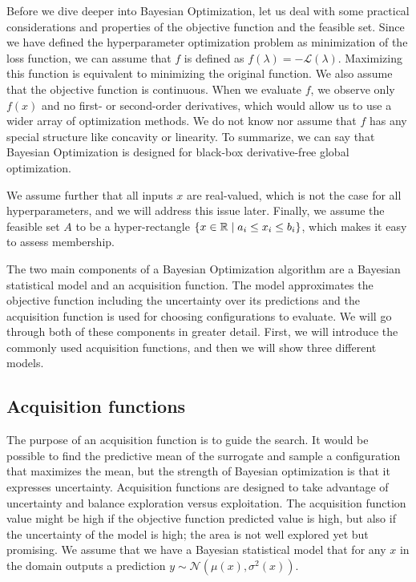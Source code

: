 Before we dive deeper into Bayesian Optimization, let us deal with some practical considerations and properties of the objective function and the feasible set. Since we have defined the hyperparameter optimization problem as minimization of the loss function, we can assume that $f$ is defined as $f(\lambda)=-\mathcal{L}(\lambda)$. Maximizing this function is equivalent to minimizing the original function. We also assume that the objective function is continuous. When we evaluate $f$, we observe only $f(x)$ and no first- or second-order derivatives, which would allow us to use a wider array of optimization methods. We do not know nor assume that $f$ has any special structure like concavity or linearity. To summarize, we can say that Bayesian Optimization is designed for black-box derivative-free global optimization.


We assume further that all inputs $x$ are real-valued, which is not the case for all hyperparameters, and we will address this issue later. Finally, we assume the feasible set $A$ to be a hyper-rectangle $\{ x \in \mathbb{R} \mid a_i \leq x_i \leq b_i \}$, which makes it easy to assess membership.


The two main components of a Bayesian Optimization algorithm are a Bayesian statistical model and an acquisition function. The model approximates the objective function including the uncertainty over its predictions and the acquisition function is used for choosing configurations to evaluate. We will go through both of these components in greater detail. First, we will introduce the commonly used acquisition functions, and then we will show three different models.

\subsection{Acquisition functions}
The purpose of an acquisition function is to guide the search. It would be possible to find the predictive mean of the surrogate and sample a configuration that maximizes the mean, but the strength of Bayesian optimization is that it expresses uncertainty. Acquisition functions are designed to take advantage of uncertainty and balance exploration versus exploitation. The acquisition function value might be high if the objective function predicted value is high, but also if the uncertainty of the model is high; the area is not well explored yet but promising. We assume that we have a Bayesian statistical model that for any $x$ in the domain outputs a prediction $y \sim \mathcal{N}(\mu(x), \sigma^2(x))$.

